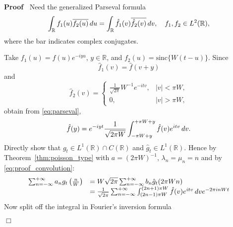 \documentclass{article}
\newenvironment{proof}{\noindent\textbf{Proof\ }}{\hspace*{\fill}$\Box$\medskip}
\begin{document}
\begin{proof}
  Need the generalized Parseval formula
  \begin{equation}
    \int_{\mathbb{R}} f_1 (u) \overline{f_2 (u)} \hspace{0.17em} du =
    \int_{\mathbb{R}} \hat{f}_1 (v) \overline{\hat{f}_2 (v)} \hspace{0.17em}
    dv, \quad f_1, f_2 \in L^2 (\mathbb{R}), \label{eq:parseval}
  \end{equation}
  where the bar indicates complex conjugates.
  
  Take $f_1 (u) = f (u) e^{- iyu}$, $y \in \mathbb{R}$, and $f_2 (u) =
  \mathrm{sinc} \{W (t - u)\}$. Since
  \begin{equation}
    \hat{f}_1 (v) = \hat{f}  (v + y) \label{eq:proof_f1_hat}
  \end{equation}
  and
  \begin{equation}
    \hat{f}_2 (v) = \left\{\begin{array}{ll}
      \frac{1}{\sqrt{2 \pi}} W^{- 1} e^{- itv}, & |v| < \pi W,\\
      0, & |v| > \pi W,
    \end{array}\right. \label{eq:proof_f2_hat}
  \end{equation}
  obtain from \eqref{eq:parseval},
  \begin{equation}
    \hat{f} (y) = e^{- iyt}  \frac{1}{\sqrt{2 \pi W}}  \int_{- \pi W + y}^{+
    \pi W + y} \hat{f} (v) e^{itv}  \hspace{0.17em} dv.
    \label{eq:proof_convolution}
  \end{equation}
  Directly show that $g_t \in L^1 (\mathbb{R}) \cap C (\mathbb{R})$ and
  $\hat{g}_t \in L^1 (\mathbb{R})$. Hence by Theorem~\ref{thm:poisson_type}
  with $a = (2 \pi W)^{- 1}$, $\lambda_n = \mu_n = n$ and by
  \eqref{eq:proof_convolution}:
  \begin{equation}
    \begin{array}{ll}
      \sum_{n = - \infty}^{+ \infty} a_n g_t \left( \frac{n}{W} \right) & = W
      \sqrt{2 \pi}  \sum_{n = - \infty}^{+ \infty} b_n  \hat{g}_t  (2 \pi
      Wn)\\
      & = \frac{1}{\sqrt{2 \pi}}  \sum_{n = - \infty}^{+ \infty} \int_{(2 n -
      1) \pi W}^{(2 n + 1) \pi W} \hat{f} (v) e^{itv}  \hspace{0.17em} dve^{-
      2 \pi inWt}
    \end{array} \label{eq:proof_poisson}
  \end{equation}
  Now split off the integral in Fourier's inversion formula

\end{proof}
\end{document}
